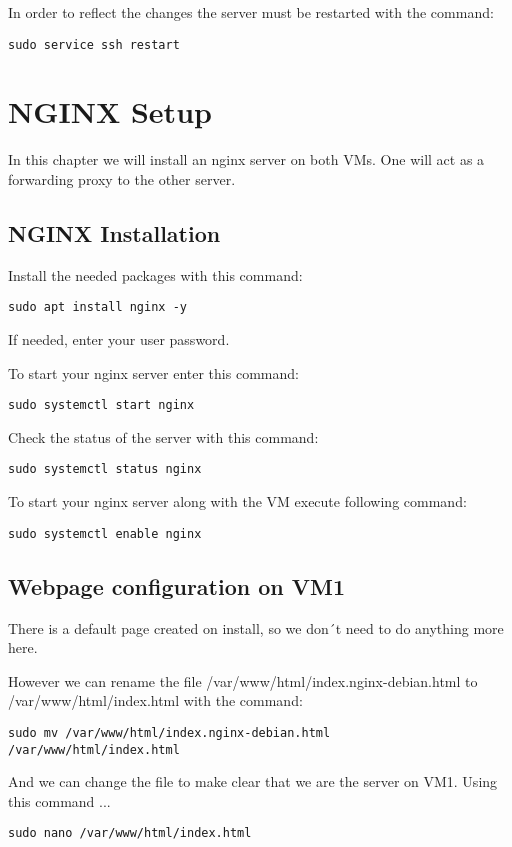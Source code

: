 \documentclass[10pt,a4paper]{article}
\begin{document}
In order to reflect the changes the server must be restarted with the command:
\begin{verbatim}
sudo service ssh restart
\end{verbatim}

\newpage
\section{NGINX Setup}
In this chapter we will install an nginx server on both VMs. One will act as a forwarding proxy to the other server.

\subsection{NGINX Installation}
Install the needed packages with this command:
\begin{verbatim}
sudo apt install nginx -y
\end{verbatim}

If needed, enter your user password.

To start your nginx server enter this command:
\begin{verbatim}
sudo systemctl start nginx
\end{verbatim}

Check the status of the server with this command:
\begin{verbatim}
sudo systemctl status nginx
\end{verbatim}

To start your nginx server along with the VM execute following command:
\begin{verbatim}
sudo systemctl enable nginx
\end{verbatim}

\subsection{Webpage configuration on VM1}
There is a default page created on install, so we don´t need to do anything more here.

However we can rename the file /var/www/html/index.nginx-debian.html to /var/www/html/index.html with the command:
\begin{verbatim}
sudo mv /var/www/html/index.nginx-debian.html 
/var/www/html/index.html
\end{verbatim}

And we can change the file to make clear that we are the server on VM1. Using this command ...
\begin{verbatim}
sudo nano /var/www/html/index.html
\end{verbatim}
\end{document}
